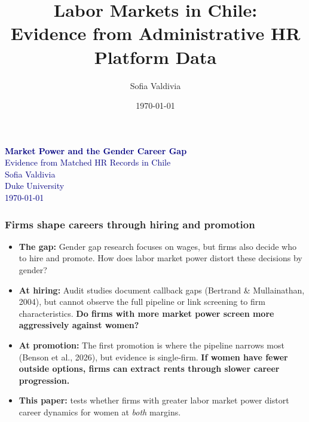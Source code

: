 \documentclass[aspectratio=169, 11pt]{beamer}
\title{Labor Markets in Chile:\\Evidence from Administrative HR Platform Data}
\author{Sofia Valdivia}
\institute{Duke University}
\date{\today}
\newcommand{\bmark}[1]{\textcolor{midblue}{\textbf{#1}}}
\begin{document}
{
\begin{frame}[plain]
\vfill
\begin{center}
{\Large\bfseries\textcolor{navy}{Market Power and the Gender Career Gap}}\\[6pt]
{\large\textcolor{navy}{Evidence from Matched HR Records in Chile}}\\[20pt]
{\normalsize\textcolor{navy}{Sofia Valdivia}}\\[4pt]
{\small\textcolor{navy}{Duke University}}\\[16pt]
{\small\textcolor{navy}{\today}}
\end{center}
\vfill
\end{frame}
}


\begin{frame}
\frametitle{Firms shape careers through hiring and promotion}

\begin{itemize}
    \item \textbf{The gap:} Gender gap research focuses on wages, but firms also decide who to hire and promote. How does labor market power distort these decisions by gender?

    \medskip
    \item \textbf{At hiring:} Audit studies document callback gaps (Bertrand \& Mullainathan, 2004), but cannot observe the full pipeline or link screening to firm characteristics. \bmark{Do firms with more market power screen more aggressively against women?}

    \medskip
    \item \textbf{At promotion:} The first promotion is where the pipeline narrows most (Benson et al., 2026), but evidence is single-firm. \bmark{If women have fewer outside options, firms can extract rents through slower career progression.}

    \medskip
    \item \textbf{This paper:} tests whether firms with greater labor market power distort career dynamics for women at \emph{both} margins.
\end{itemize}


\end{frame}
\end{document}
